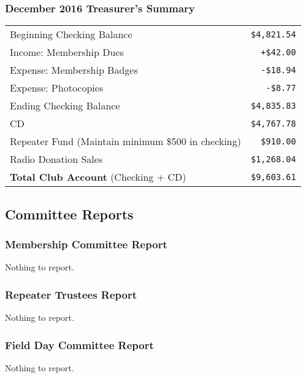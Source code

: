\documentclass[10pt,letterpaper]{article}
\begin{document}
\subsubsection{December 2016 Treasurer's Summary}
\noindent
\begin{tabular}{|l|r|}
  \hline
  Beginning Checking Balance & \texttt{\$4,821.54} \\
  Income: Membership Dues & \texttt{+\$42.00} \\
  Expense: Membership Badges & \texttt{-\$18.94} \\
  Expense: Photocopies & \texttt{-\$8.77} \\
  Ending Checking Balance & \texttt{\$4,835.83} \\
  \hline
  \hline
  CD & \texttt{\$4,767.78} \\
  \hline
  \hline
  Repeater Fund (Maintain minimum \$500 in checking) & \texttt{\$910.00} \\
  \hline
  \hline
  Radio Donation Sales & \texttt{\$1,268.04} \\
  \hline
  \hline
  \textbf{Total Club Account} (Checking + CD) & \texttt{\$9,603.61} \\
  \hline
\end{tabular}

\subsection{Committee Reports}

\subsubsection{Membership Committee Report}
Nothing to report.

\subsubsection{Repeater Trustees Report}
Nothing to report.

\subsubsection{Field Day Committee Report}
Nothing to report.
\end{document}
